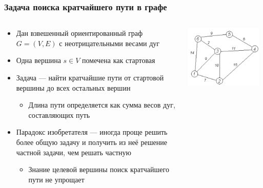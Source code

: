 \documentclass{../../slides-style}
\begin{document}
\begin{frame}
\begin{columns}
\begin{column}{0.3\textwidth}
\begin{center}
                \end{center}
            \end{column}
        \end{columns}
    \end{frame}

    \begin{frame}
        \frametitle{Задача поиска кратчайшего пути в графе}
        \begin{columns}
            \begin{column}{0.65\textwidth}
                \begin{itemize}
                    \item Дан взвешенный ориентированный граф $G = (V, E)$ с неотрицательными весами дуг
                    \item Одна вершина $s \in V$ помечена как стартовая
                    \item Задача --- найти кратчайшие пути от стартовой вершины до всех остальных вершин
                    \begin{itemize}
                        \item Длина пути определяется как сумма весов дуг, составляющих путь
                    \end{itemize}
                    \item Парадокс изобретателя --- иногда проще решить более общую задачу и получить из неё решение частной задачи, чем решать частную
                    \begin{itemize}
                        \item Знание целевой вершины поиск кратчайшего пути не упрощает
                    \end{itemize}
                \end{itemize}
            \end{column}
            \begin{column}{0.35\textwidth}
                \begin{center}
                    \includegraphics[width=0.95\textwidth]{shortest-path.png}

\end{center}
\end{column}
\end{columns}
\end{frame}
\end{document}
